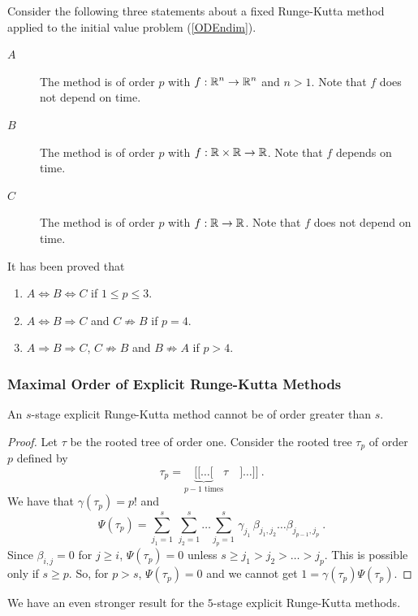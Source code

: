 \begin{rmk}
Consider the following three statements about a fixed Runge-Kutta
method applied to the initial value problem (\ref{ODEndim}).
\begin{description}
\item[$A$] The method is of order $p$ with
$\displaystyle f:\mathbb{R}^n \rightarrow \mathbb{R}^n$ and $n>1$.  Note that $f$ does
not depend on time.
\item[$B$] The method is of order $p$ with $f:\mathbb{R} \times \mathbb{R} \rightarrow \mathbb{R}$.
Note that $f$ depends on time. 
\item[$C$] The method is of order $p$ with $f:\mathbb{R} \rightarrow \mathbb{R}$.  Note
that $f$ does not depend on time. 
\end{description}
It has been proved that
\begin{enumerate}
\item $A \Leftrightarrow B \Leftrightarrow C$  if $1\leq p \leq 3$.
\item $A \Leftrightarrow B \Rightarrow C$ and $C \not\Rightarrow B$ if
$p=4$.
\item $A \Rightarrow B \Rightarrow C$, $C \not\Rightarrow B$ and
$B \not\Rightarrow A$ if $p > 4$.
\end{enumerate}
\end{rmk}

\subsubsection{Maximal Order of Explicit Runge-Kutta Methods}

\begin{theorem}
An $s$-stage explicit Runge-Kutta method cannot be of order greater
than $s$.
\end{theorem}

\begin{proof}
Let $\tau$ be the rooted tree of order one.  Consider the rooted tree
$\tau_p$ of order $p$ defined by
\[
\tau_p = \underbrace{[[\ldots[}_{\text{$p-1$ times}} \tau \quad ]\ldots]]
\ .
\]
We have that $\gamma(\tau_p) = p!$ and
\[
\Psi(\tau_p) = \sum_{j_1=1}^s\,\sum_{j_2=1}^s\ldots\sum_{j_p=1}^s\,
\gamma_{j_1}\,\beta_{j_1,j_2}\dots \beta_{j_{p-1},j_p} \ .
\]
Since $\beta_{i,j} = 0$ for $j\geq i$, $\Psi(\tau_p)=0$ unless
$s \geq j_1 > j_2 > \ldots > j_p$.  This is possible only if
$s \geq p$.  So, for $p>s$, $\Psi(\tau_p) = 0$ and we cannot get
$1 = \gamma(\tau_p)\Psi(\tau_p)$.
\end{proof}

We have an even stronger result for the $5$-stage explicit Runge-Kutta
methods.

